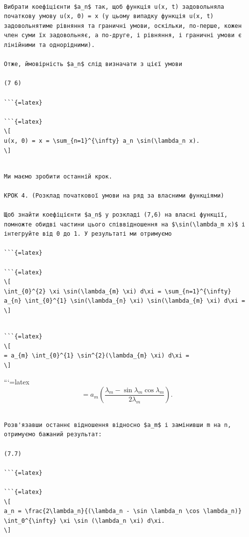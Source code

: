 \documentclass[
  ukrainian,
]{article}
\begin{document}
\begin{verbatim}

Вибрати коефіцієнти $a_n$ так, щоб функція u(x, t) задовольняла початкову умову u(x, 0) = x (у цьому випадку функція u(x, t) задовольнятиме рівняння та граничні умови, оскільки, по-перше, кожен член суми їх задовольняє, а по-друге, і рівняння, і граничні умови є лінійними та однорідними).

Отже, ймовірність $a_n$ слід визначати з цієї умови

(7 6)

```{=latex}

```{=latex}
\[
u(x, 0) = x = \sum_{n=1}^{\infty} a_n \sin(\lambda_n x).
\]
\end{verbatim}

\begin{verbatim}

Ми маємо зробити останній крок.

КРОК 4. (Розклад початкової умови на ряд за власними функціями)

Щоб знайти коефіцієнти $a_n$ у розкладі (7,6) на власні функції, помножте обидві частини цього співвідношення на $\sin(\lambda_m x)$ і інтегруйте від 0 до 1. У результаті ми отримуємо

```{=latex}

```{=latex}
\[
\int_{0}^{2} \xi \sin(\lambda_{m} \xi) d\xi = \sum_{n=1}^{\infty} a_{n} \int_{0}^{1} \sin(\lambda_{n} \xi) \sin(\lambda_{m} \xi) d\xi =
\]
\end{verbatim}

\begin{verbatim}

```{=latex}
\[
= a_{m} \int_{0}^{1} \sin^{2}(\lambda_{m} \xi) d\xi =
\]
\end{verbatim}

```{=latex}
\[
= a_{m} \left( \frac{\lambda_{m} - \sin \lambda_{m} \cos \lambda_{m}}{2\lambda_{m}} \right).
\]

\begin{verbatim}

Розв'язавши останнє відношення відносно $a_m$ і замінивши m на n, отримуємо бажаний результат:

(7.7)

```{=latex}

```{=latex}
\[
a_n = \frac{2\lambda_n}{(\lambda_n - \sin \lambda_n \cos \lambda_n)} \int_0^{\infty} \xi \sin (\lambda_n \xi) d\xi.
\]
\end{verbatim}
\end{document}
